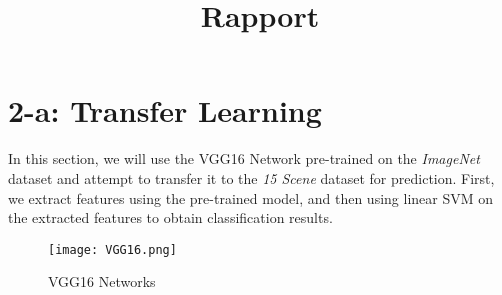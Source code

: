 \documentclass{rapportECL}
\title{Rapport} %
\begin{document}




        
\fairemarges %
\fairepagedegarde %

\newpage

\tabledematieres


\newpage
\chapter*{2-a: Transfer Learning}
\setcounter{section}{0}

In this section, we will use the VGG16 Network pre-trained on the \textit{ImageNet} dataset and attempt to transfer it to the \textit{15 Scene} dataset for prediction. First, we extract features using the pre-trained model, and then using linear SVM on the extracted features to obtain classification results.
\begin{figure}[H]
    \centering
    \texttt{[image: VGG16.png]}
    \caption{VGG16 Networks}
    \label{fig:1}
\end{figure}
\end{document}
